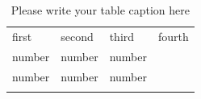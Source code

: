 %
\begin{table}
\caption{Please write your table caption here}
\label{tab:1}       %
\begin{tabular}{llll}
\hline\noalign{\smallskip}
first & second & third & fourth \\
\noalign{\smallskip}\hline\noalign{\smallskip}
number & number & number \\
number & number & number \\
\noalign{\smallskip}\hline
\end{tabular}
\end{table}




%
%





